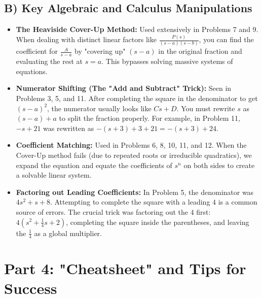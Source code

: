 \documentclass[11pt, a4paper]{article}
\theoremstyle{definition}
\theoremstyle{remark}
\begin{document}
\subsection{B) Key Algebraic and Calculus Manipulations}
\begin{itemize}
    \item \textbf{The Heaviside Cover-Up Method:} Used extensively in Problems 7 and 9. When dealing with distinct linear factors like $\frac{P(s)}{(s-a)(s-b)}$, you can find the coefficient for $\frac{A}{s-a}$ by "covering up" $(s-a)$ in the original fraction and evaluating the rest at $s=a$. This bypasses solving massive systems of equations.
    \item \textbf{Numerator Shifting (The "Add and Subtract" Trick):} Seen in Problems 3, 5, and 11. After completing the square in the denominator to get $(s-a)^2$, the numerator usually looks like $Cs + D$. You must rewrite $s$ as $(s-a) + a$ to split the fraction properly. For example, in Problem 11, $-s + 21$ was rewritten as $-(s+3) + 3 + 21 = -(s+3) + 24$.
    \item \textbf{Coefficient Matching:} Used in Problems 6, 8, 10, 11, and 12. When the Cover-Up method fails (due to repeated roots or irreducible quadratics), we expand the equation and equate the coefficients of $s^n$ on both sides to create a solvable linear system.
    \item \textbf{Factoring out Leading Coefficients:} In Problem 5, the denominator was $4s^2 + s + 8$. Attempting to complete the square with a leading $4$ is a common source of errors. The crucial trick was factoring out the $4$ first: $4(s^2 + \frac{1}{4}s + 2)$, completing the square inside the parentheses, and leaving the $\frac{1}{4}$ as a global multiplier.
\end{itemize}

\newpage
\section{Part 4: "Cheatsheet" and Tips for Success}
\end{document}
